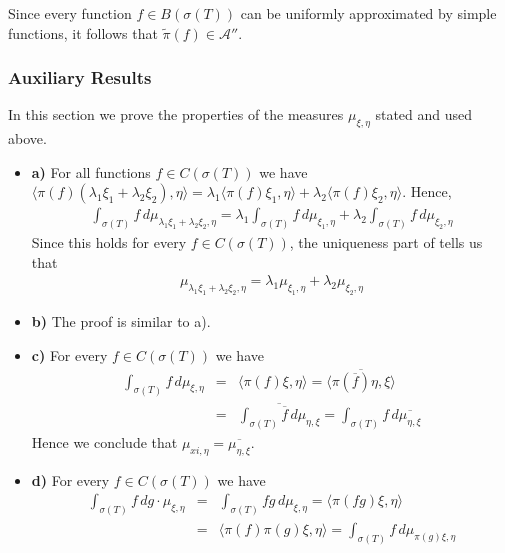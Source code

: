 \documentclass[12pt]{article}
\begin{document}
Since every function $f \in B(\sigma(T))$ can be uniformly approximated by simple functions, it follows that $\widetilde{\pi}(f) \in \mathcal{A}''$.

\subsubsection{Auxiliary Results}

In this section we prove the properties of the measures $\mu_{\xi, \eta}$ stated and used above.

\begin{itemize}
\item[] {\bf a)} For all functions $f \in C(\sigma(T))$ we have $\langle \pi(f) (\lambda_1\xi_1 + \lambda_2 \xi_2), \eta \rangle = \lambda_1\langle \pi(f) \xi_1 , \eta \rangle + \lambda_2 \langle \pi(f) \xi_2, \eta \rangle$. Hence,
\begin{align*}
\int_{\sigma(T)} f \, d\mu_{\lambda_1\xi_1+\lambda_2\xi_2, \eta} = \lambda_1\int_{\sigma(T)} f \, d\mu_{\xi_1, \eta} + \lambda_2\int_{\sigma(T)} f \,d\mu_{\xi_2, \eta}
\end{align*}
Since this holds for every $f \in C(\sigma(T))$, the uniqueness part of  tells us that
\begin{align*}
\mu_{\lambda_1\xi_1+\lambda_2\xi_2, \eta} = \lambda_1\mu_{\xi_1, \eta} + \lambda_2\mu_{\xi_2, \eta}
\end{align*}
\item[] {\bf b)} The proof is similar to a).
\item[] {\bf c)} For every $f \in C(\sigma(T))$ we have
\begin{eqnarray*}
\int_{\sigma(T)} f \, d\mu_{\xi, \eta} & = & \langle \pi(f) \xi, \eta \rangle = \overline{\langle \pi(\overline{f}) \eta, \xi \rangle}\\
& = & \overline{\int_{\sigma(T)} \overline{f} \, d\mu_{\eta, \xi}} = \int_{\sigma(T)} f \, d\overline{\mu_{\eta, \xi}}
\end{eqnarray*}
Hence we conclude that $\mu_{xi, \eta} = \overline{\mu_{\eta, \xi}}$.
\item[] {\bf d)} For every $f \in C(\sigma(T))$ we have
\begin{eqnarray*}
\int_{\sigma(T)} f \, dg \cdot\mu_{\xi, \eta} & = & \int_{\sigma(T)} fg \, d\mu_{\xi, \eta} = \langle \pi(fg) \xi, \eta \rangle\\
& = & \langle \pi(f)\pi(g) \xi, \eta \rangle = \int_{\sigma(T)} f \, d\mu_{\pi(g)\xi, \eta}
\end{eqnarray*}

\end{itemize}
\end{document}
